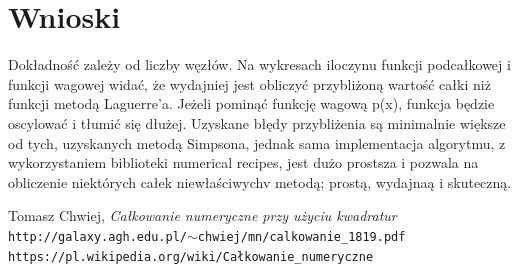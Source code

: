 \documentclass{article}
\begin{document}
\section{Wnioski}
Dokładność zależy od liczby węzłów. Na wykresach iloczynu funkcji podcałkowej i funkcji wagowej widać, że wydajniej jest obliczyć przybliżoną wartość całki niż funkcji metodą Laguerre’a. Jeżeli pominąć funkcję wagową p(x), funkcja będzie oscylować i tłumić się dłużej. Uzyskane błędy przybliżenia są minimalnie większe od tych, uzyskanych metodą Simpsona, jednak
sama implementacja algorytmu, z wykorzystaniem biblioteki numerical recipes, jest dużo prostsza i pozwala na obliczenie niektórych całek niewłaściwychv metodą; prostą, wydajnaą i skuteczną.

\begin{thebibliography}{1}

	Tomasz Chwiej, \emph{Całkowanie numeryczne przy użyciu kwadratur} \\
	\texttt{http://galaxy.agh.edu.pl/$\sim$chwiej/mn/calkowanie\_1819.pdf}	
	\texttt{https://pl.wikipedia.org/wiki/Całkowanie\_numeryczne}
	

\end{thebibliography}
\end{document}
